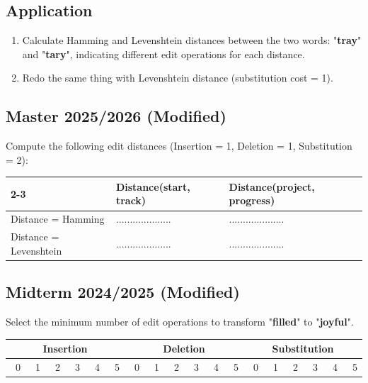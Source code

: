 \documentclass{../extra/aakpract/aakpract}
\begin{document}
	\subsection{Application}
	
	\begin{enumerate}
		\item Calculate Hamming and Levenshtein distances between the two words: "\textbf{tray}" and "\textbf{tary}", indicating different edit operations for each distance. 
		\item Redo the same thing with Levenshtein distance (substitution cost = 1).
	\end{enumerate}
	
	\newpage
	\subsection{Master 2025/2026 (Modified)}
	
	Compute the following edit distances (Insertion = 1, Deletion = 1, Substitution = 2):
	
	\begin{center}
		\begin{tabular}{|l|p{5cm}|p{5cm}|}
			\cline{2-3}
			\multicolumn{1}{c|}{} & Distance(start, track) & Distance(project, progress) \\
			\hline
			Distance = Hamming & .................... & .................... \\
			\hline
			Distance = Levenshtein & .................... & .................... \\
			\hline
		\end{tabular}
	\end{center}
	
	\subsection{Midterm 2024/2025 (Modified)}
	
	Select the minimum number of edit operations to transform "\textbf{filled}" to "\textbf{joyful}".
	
	\begin{center}
		\begin{tabular}{|c|c|c|}
			\hline
			Insertion & Deletion & Substitution \\
			\hline
			\Circle\ 0\ \ \Circle\ 1\ \ \Circle\ 2\ \ \Circle\ 3\ \ \Circle\ 4\ \ \Circle\ 5  & 
			\Circle\ 0\ \ \Circle\ 1\ \ \Circle\ 2\ \ \Circle\ 3\ \ \Circle\ 4\ \ \Circle\ 5  &
			\Circle\ 0\ \ \Circle\ 1\ \ \Circle\ 2\ \ \Circle\ 3\ \ \Circle\ 4\ \ \Circle\ 5  \\
			\hline
		\end{tabular}
	\end{center}
	
\end{document}
